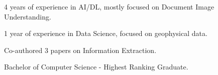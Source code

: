 
\begin{zitemize}
    \item 4 years of experience in AI/DL, mostly focused on Document Image Understanding.
    \item 1 year of experience in Data Science, focused on geophysical data.
    \item Co-authored 3 papers on Information Extraction.
    \item Bachelor of Computer Science - Highest Ranking Graduate.
\end{zitemize}
